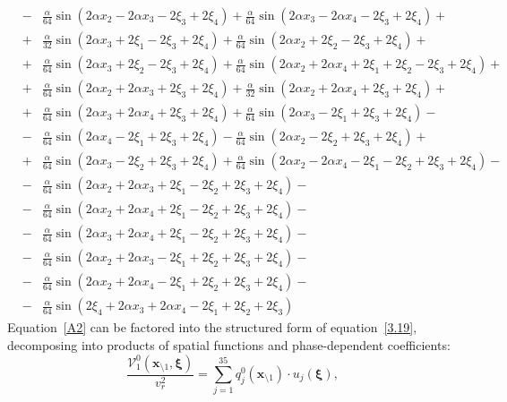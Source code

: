 \documentclass[11pt]{jfm}
\numberwithin{equation}{section}
\begin{document}
\begin{eqnarray}
&-&\frac{\alpha}{64}  \sin (2 \alpha x_2-2 \alpha x_3-2 \xi_3+2 \xi_4)+\frac{\alpha}{64}  \sin (2 \alpha x_3-2 \alpha x_4-2 \xi_3+2 \xi_4)+ \nonumber\\
&+&\frac{\alpha}{32}   \sin (2 \alpha x_3+2 \xi_1-2 \xi_3+2 \xi_4)+\frac{\alpha}{64}  \sin (2 \alpha x_2+2 \xi_2-2 \xi_3+2 \xi_4)+ \nonumber\\
&\!+\!&\frac{\alpha}{64}  \sin (2 \alpha x_3\!+\!2 \xi_2\!-\!2 \xi_3\!+\!2 \xi_4)\!+\!\frac{\alpha}{64}  \sin (2 \alpha x_2\!+\!2 \alpha x_4\!+\!2 \xi_1\!+\!2 \xi_2\!-\!2 \xi_3\!+\!2 \xi_4)+ \nonumber\\
&+&\frac{\alpha}{64}  \sin (2 \alpha x_2+2 \alpha x_3+2 \xi_3+2 \xi_4)+\frac{\alpha}{32}   \sin (2 \alpha x_2+2 \alpha x_4+2 \xi_3+2 \xi_4)+ \nonumber\\
&+&\frac{\alpha}{64}  \sin (2 \alpha x_3+2 \alpha x_4+2 \xi_3+2 \xi_4)+\frac{\alpha}{64}  \sin (2 \alpha x_3-2 \xi_1+2 \xi_3+2 \xi_4)- \nonumber\\
&-&\frac{\alpha}{64}  \sin (2 \alpha x_4-2 \xi_1+2 \xi_3+2 \xi_4)-\frac{\alpha}{64}  \sin (2 \alpha x_2-2 \xi_2+2 \xi_3+2 \xi_4)+ \nonumber\\
&\!+\!&\frac{\alpha}{64}  \sin (2 \alpha x_3\!-\!2 \xi_2\!+\!2 \xi_3\!+\!2 \xi_4)\!+\!\frac{\alpha}{64}  \sin (2 \alpha x_2\!-\!2 \alpha x_4\!-\!2 \xi_1\!-\!2 \xi_2\!+\!2 \xi_3\!+\!2 \xi_4)\!-\!\nonumber\\
&-&\frac{\alpha}{64}  \sin (2 \alpha x_2+2 \alpha x_3+2 \xi_1-2 \xi_2+2 \xi_3+2 \xi_4)- \nonumber\\
&-&\frac{\alpha}{64}  \sin (2 \alpha x_2+2 \alpha x_4+2 \xi_1-2 \xi_2+2 \xi_3+2 \xi_4)- \nonumber\\
&-&\frac{\alpha}{64}  \sin (2 \alpha x_3+2 \alpha x_4+2 \xi_1-2 \xi_2+2 \xi_3+2 \xi_4)- \nonumber\\
&-&\frac{\alpha}{64}  \sin (2 \alpha x_2+2 \alpha x_3-2 \xi_1+2 \xi_2+2 \xi_3+2 \xi_4)- \nonumber\\
&-&\frac{\alpha}{64}  \sin (2 \alpha x_2+2 \alpha x_4-2 \xi_1+2 \xi_2+2 \xi_3+2 \xi_4)- \nonumber\\
&-&\frac{\alpha}{64}  \sin (2 \xi_4+2 \alpha x_3+2 \alpha x_4-2 \xi_1+2 \xi_2+2 \xi_3)
\end{eqnarray}
Equation~\eqref{A2} can be factored into the structured form of equation~\eqref{3.19}, decomposing into products of spatial functions and phase-dependent coefficients:
\begin{equation}
\label{A3}
    \frac{\mathcal{V}_1^0(\boldsymbol{x}_{\setminus 1}, \boldsymbol{\xi})}{v_r^2} = \sum_{j=1}^{35} q_j^0(\boldsymbol{x}_{\setminus 1}) \cdot u_j(\boldsymbol{\xi}),
\end{equation}
\end{document}
